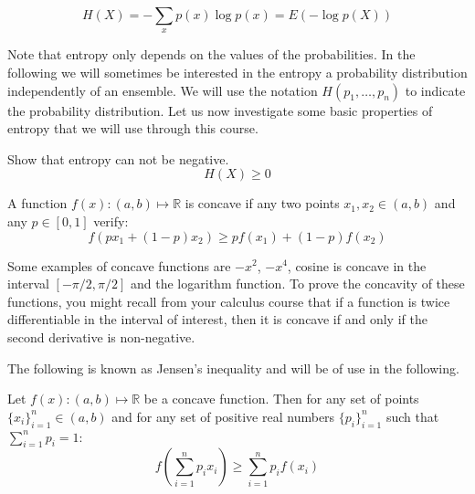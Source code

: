 \begin{equation}
  \label{eq:mean}
  H({X})=-\sum_{x} p(x)\log p(x) = E(-\log p({X}))
\end{equation}

Note that entropy only depends on the values of the probabilities. In the following we will sometimes be interested in the entropy a probability distribution independently of an ensemble. We will use the notation $H(p_1,\ldots,p_n)$ to indicate the probability distribution. Let us now investigate some basic properties of entropy that we will use through this course.

\begin{exercise}Show that entropy can not be negative.
  \label{ex:entropynonnegative}
  \begin{equation*}
    H({X})\geq 0
  \end{equation*}
\end{exercise}
\begin{definition} A function $f(x):(a,b)\mapsto\mathbb R$ is concave if any two points $x_1,x_2\in(a,b)$ and any $p\in[0,1]$ verify:
        \begin{equation}
        f(px_1+(1-p)x_2) \geq pf(x_1)+(1-p)f(x_2)
         \end{equation}
\end{definition}
\begin{example}
Some examples of concave functions are $-x^2$, $-x^4$, cosine is concave in the interval $[-\pi/2,\pi/2]$ and the logarithm function. To prove the concavity of these functions, you might recall from your calculus course that if a function is twice differentiable in the interval of interest, then it is concave if and only if the second derivative is non-negative.
\end{example}

The following is known as Jensen's inequality and will be of use in the following. 
\begin{theorem} Let $f(x):(a,b)\mapsto\mathbb R$ be a concave function. Then for any set of points $\{x_i\}_{i=1}^n\in(a,b)$ and for any set of positive real numbers $\{p_i\}_{i=1}^n$ such that $\sum_{i=1}^np_i=1$: 
  \label{th:jensen}
  \begin{equation*}
 f\left(\sum_{i=1}^np_ix_i\right) \geq \sum_{i=1}^np_if(x_i) 
  \end{equation*}
\end{theorem}

